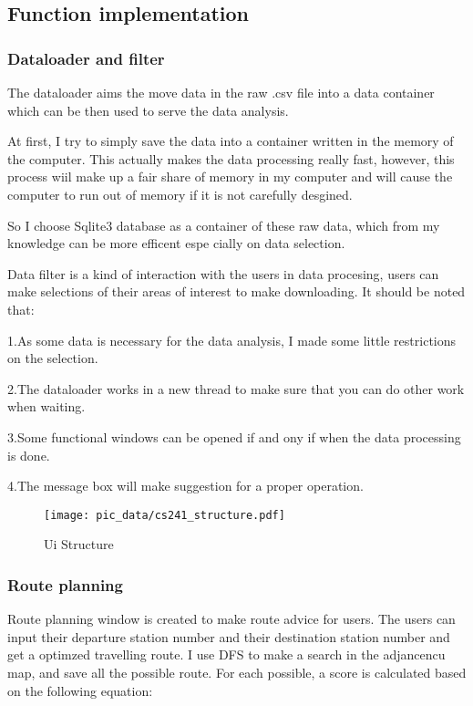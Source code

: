 \documentclass[transmag]{IEEEtran}
\begin{document}
\subsection{Function implementation}
\subsubsection{Dataloader and filter}
  The dataloader aims the move data in the raw .csv file into a data container which can be then used to serve the data 
  analysis. 
  
  At first, I try to simply save the data into a container written in the memory of the computer. This actually makes 
  the data processing really fast, however, this process wiil make up a fair share of memory in my computer and 
  will cause the computer to run out of memory if it is not carefully desgined.

  So I choose Sqlite3 database as a container of these raw data, which from my knowledge can be more efficent espe
  cially on data selection. 

  Data filter is a kind of interaction with the users in data procesing, users can make selections of their areas 
  of interest to  make downloading. It should be noted that: 
  
  1.As some data is necessary for the data analysis, I made some little restrictions on the selection.

  2.The dataloader works in a new thread to make sure that you can do other work when waiting.


  3.Some functional windows can be opened if and ony if when the data processing is done.
  
  
  4.The message box will make 
  suggestion for a proper operation.
  \begin{figure}
    \centerline{\texttt{[image: pic\_data/cs241\_structure.pdf]}}
    \caption{Ui Structure}
    \end{figure}



  \subsubsection{Route planning}
  Route planning window is created to make route advice for users. The users can input their departure station number and 
  their destination station number and get a optimzed travelling route. I use DFS to make a search in the adjancencu map,
  and save all the possible route. For each possible, a score is calculated based on the following equation:
\end{document}
